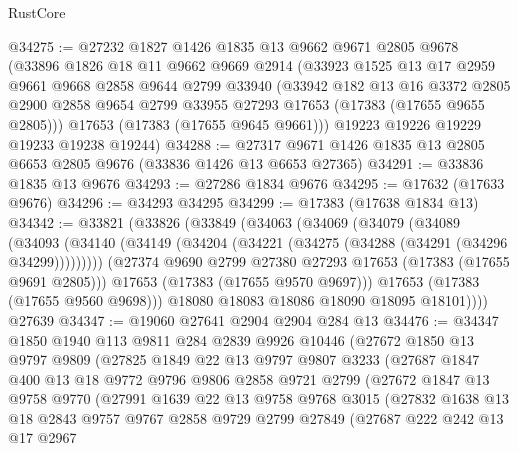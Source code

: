 \begin{lexlean}{RustCore}
\begin{coremodule}
@34275 := @27232
    @1827
    @1426
    @1835
    @13
    @9662
    @9671
    @2805
    @9678
    (@33896
      @1826
      @18
      @11
      @9662
      @9669
      @2914
      (@33923
        @1525
        @13
        @17
        @2959
        @9661
        @9668
        @2858
        @9644
        @2799
        @33940
        (@33942
          @182
          @13
          @16
          @3372
          @2805
          @2900
          @2858
          @9654
          @2799
          @33955
          @27293
          @17653
          (@17383 (@17655 @9655 @2805)))
        @17653
        (@17383 (@17655 @9645 @9661)))
      @19223
      @19226
      @19229
      @19233
      @19238
      @19244)
@34288 := @27317 @9671 @1426 @1835 @13 @2805 @6653 @2805 @9676 (@33836 @1426 @13 @6653 @27365)
@34291 := @33836 @1835 @13 @9676
@34293 := @27286 @1834 @9676
@34295 := @17632 (@17633 @9676)
@34296 := @34293 @34295
@34299 := @17383 (@17638 @1834 @13)
@34342 := @33821
    (@33826
      (@33849
        (@34063
          (@34069
            (@34079
              (@34089
                (@34093
                  (@34140 (@34149 (@34204 (@34221 (@34275 (@34288 (@34291 (@34296 @34299)))))))))
                (@27374 @9690 @2799 @27380 @27293 @17653 (@17383 (@17655 @9691 @2805)))
                @17653
                (@17383 (@17655 @9570 @9697)))
              @17653
              (@17383 (@17655 @9560 @9698)))
            @18080
            @18083
            @18086
            @18090
            @18095
            @18101))))
    @27639
@34347 := @19060 @27641 @2904 @2904 @284 @13
@34476 := @34347
    @1850
    @1940
    @113
    @9811
    @284
    @2839
    @9926
    @10446
    (@27672
      @1850
      @13
      @9797
      @9809
      (@27825
        @1849
        @22
        @13
        @9797
        @9807
        @3233
        (@27687
          @1847
          @400
          @13
          @18
          @9772
          @9796
          @9806
          @2858
          @9721
          @2799
          (@27672
            @1847
            @13
            @9758
            @9770
            (@27991
              @1639
              @22
              @13
              @9758
              @9768
              @3015
              (@27832
                @1638
                @13
                @18
                @2843
                @9757
                @9767
                @2858
                @9729
                @2799
                @27849
                (@27687
                  @222
                  @242
                  @13
                  @17
                  @2967

\end{coremodule}
\end{lexlean}
